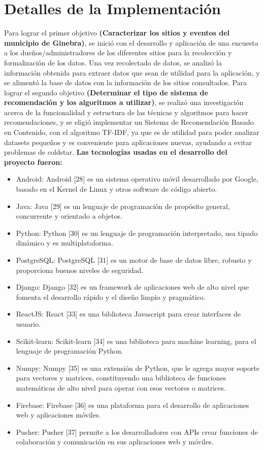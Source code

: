 \documentclass[12pt,letterpaper,openany]{book}
\begin{document}
\section{Detalles de la Implementación}
Para lograr el primer objetivo \textbf{(Caracterizar los sitios y eventos del municipio de Ginebra)}, se inició con el desarrollo y aplicación de una encuesta a los dueños/administradores de los diferentes sitios para la recolección y formalización de los datos.
Una vez recolectado de datos, se analizó la información obtenida para extraer datos que sean de utilidad para la aplicación, y se alimentó la base de datos con la información de los sitios consultados.
\vspace{5mm}\newline
Para lograr el segundo objetivo \textbf{(Determinar el tipo de sistema de recomendación y los algoritmos a utilizar)}, se realizó una investigación acerca de la funcionalidad y estructura de las técnicas y algoritmos para hacer recomendaciones, y se eligió implementar un Sistema de Recomendación Basado en Contenido, con el algoritmo TF-IDF, ya que es de utilidad para poder analizar datasets pequeños y es conveniente para aplicaciones nuevas, ayudando a evitar problemas de coldstar.
\vspace{5mm}\newline
\textbf{Las tecnologías usadas en el desarrollo del proyecto fueron:}
\begin{itemize}
    \item Android: Android [28] es un sistema operativo móvil desarrollado por Google, basado en el Kernel de Linux y otros software de código abierto.
    \item Java: Java [29] es un lenguaje de programación de propósito general, concurrente y orientado a objetos.
    \item Python: Python [30] es un lenguaje de programación interpretado, usa tipado dinámico y es multiplataforma.
    \item PostgreSQL: PostgreSQL [31] es un motor de base de datos libre, robusto y proporciona buenos niveles de seguridad.
    \item Django: Django [32] es un framework de aplicaciones web de alto nivel que fomenta el desarrollo rápido y el diseño limpio y pragmático.
    \item ReactJS: React [33] es una biblioteca Javascript para crear interfaces de usuario.
    \item Scikit-learn: Scikit-learn [34] es una biblioteca para machine learning, para el lenguaje de programación Python.
    \item Numpy: Numpy [35] es una extensión de Python, que le agrega mayor soporte para vectores y matrices, constituyendo una biblioteca de funciones matemáticas de alto nivel para operar con esos vectores o matrices.
    \item Firebase: Firebase [36] es una plataforma para el desarrollo de aplicaciones web y aplicaciones móviles.
    \item Pusher: Pusher [37] permite a los desarrolladores con APIs crear funciones de colaboración y comunicación en sus aplicaciones web y móviles.
\end{itemize}
\end{document}
